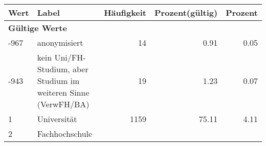      \begin{longtable}{lXrrr}
     \toprule
     \textbf{Wert} & \textbf{Label} & \textbf{Häufigkeit} & \textbf{Prozent(gültig)} & \textbf{Prozent} \\
     \endhead
     \midrule
     \multicolumn{5}{l}{\textbf{Gültige Werte}}\\

     -967 &
     \multicolumn{1}{X}{ anonymisiert   } &


       \num{14} &
       \num[round-mode=places,round-precision=2]{0.91} &
         \num[round-mode=places,round-precision=2]{0.05} \\

     -943 &
     \multicolumn{1}{X}{ kein Uni/FH-Studium, aber Studium im weiteren Sinne (VerwFH/BA)   } &


       \num{19} &
       \num[round-mode=places,round-precision=2]{1.23} &
         \num[round-mode=places,round-precision=2]{0.07} \\

     1 &
     \multicolumn{1}{X}{ Universität   } &


       \num{1159} &
       \num[round-mode=places,round-precision=2]{75.11} &
         \num[round-mode=places,round-precision=2]{4.11} \\

     2 &
     \multicolumn{1}{X}{ Fachhochschule   } &



\end{longtable}
